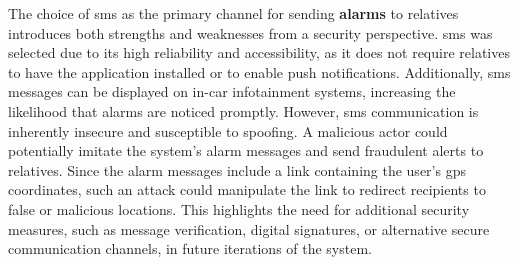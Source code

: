 The choice of \gls{sms} as the primary channel for sending \textbf{alarms} to relatives introduces both strengths and weaknesses from a security perspective. \gls{sms} was selected due to its high reliability and accessibility, as it does not require relatives to have the application installed or to enable push notifications. Additionally, \gls{sms} messages can be displayed on in-car infotainment systems, increasing the likelihood that alarms are noticed promptly. However, \gls{sms} communication is inherently insecure and susceptible to spoofing. A malicious actor could potentially imitate the system’s alarm messages and send fraudulent alerts to relatives. Since the alarm messages include a link containing the user’s \gls{gps} coordinates, such an attack could manipulate the link to redirect recipients to false or malicious locations. This highlights the need for additional security measures, such as message verification, digital signatures, or alternative secure communication channels, in future iterations of the system.